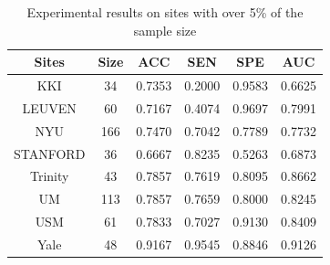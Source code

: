 \documentclass[a4paper]{cas-dc}
\begin{document}
\begin{table}[]
	\caption{Experimental results on sites with over 5\% of the sample size}\label{Table5}
	\begin{tabular*}{\tblwidth}{@{}cccccc@{}}
		\toprule
		\textbf{Sites}&\textbf{Size}& \textbf{ACC} & \textbf{SEN} & \textbf{SPE} & \textbf{AUC} \\ %
		\midrule
		KKI            & 34                   & 0.7353            & 0.2000               & 0.9583               & 0.6625       \\
		LEUVEN         & 60                   & 0.7167            & 0.4074               & 0.9697               & 0.7991       \\
		NYU            & 166                  & 0.7470            & 0.7042               & 0.7789               & 0.7732       \\
		STANFORD       & 36                   & 0.6667            & 0.8235               & 0.5263               & 0.6873       \\
		Trinity        & 43                   & 0.7857            & 0.7619               & 0.8095               & 0.8662       \\
		UM             & 113                  & 0.7857            & 0.7659               & 0.8000               & 0.8245       \\
		USM            & 61                   & 0.7833            & 0.7027               & 0.9130               & 0.8409       \\
		Yale           & 48                   & 0.9167            & 0.9545               & 0.8846               & 0.9126 \\
		\bottomrule
	\end{tabular*}
\end{table}
\end{document}
